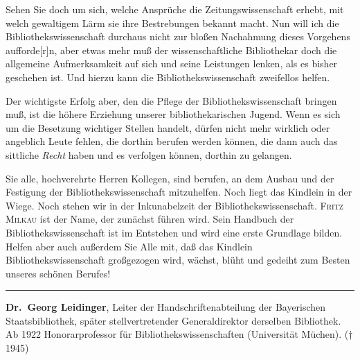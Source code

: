 \documentclass[a4paper,
fontsize=11pt,
oneside,
numbers=noperiodatend,
parskip=half-,
bibliography=totoc,
final
]{scrartcl}
\begin{document}
Sehen Sie doch um sich, welche Ansprüche die Zeitungswissenschaft
erhebt, mit welch gewaltigem Lärm sie ihre Bestrebungen bekannt macht.
Nun will ich die Bibliothekswissenschaft durchaus nicht zur bloßen
Nachahmung dieses Vorgehens aufforde{[}r{]}n, aber etwas mehr muß der
wissenschaftliche Bibliothekar doch die allgemeine Aufmerksamkeit auf
sich und seine Leistungen lenken, als es bisher geschehen ist. Und
hierzu kann die Bibliothekswissenschaft zweifellos helfen.

Der wichtigste Erfolg aber, den die Pflege der Bibliothekswissenschaft
bringen muß, ist die höhere Erziehung unserer bibliothekarischen Jugend.
Wenn es sich um die Besetzung wichtiger Stellen handelt, dürfen nicht
mehr wirklich oder angeblich Leute fehlen, die dorthin berufen werden
können, die dann auch das sittliche \emph{Recht} haben und es verfolgen
können, dorthin zu gelangen.

Sie alle, hochverehrte Herren Kollegen, sind berufen, an dem Ausbau und
der Festigung der Bibliothekswissenschaft mitzuhelfen. Noch liegt das
Kindlein in der Wiege. Noch stehen wir in der Inkunabelzeit der
Bibliothekswissenschaft. \textsc{Fritz Milkau} ist der Name, der
zunächst führen wird. Sein Handbuch der Bibliothekswissenschaft ist im
Entstehen und wird eine erste Grundlage bilden. Helfen aber auch
außerdem Sie Alle mit, daß das Kindlein Bibliothekswissenschaft
großgezogen wird, wächst, blüht und gedeiht zum Besten unseres schönen
Berufes!

\begin{center}\rule{0.5\linewidth}{\linethickness}\end{center}

\textbf{Dr.~Georg Leidinger}, Leiter der Handschriftenabteilung der
Bayerischen Staatsbibliothek, später stellvertretender Generaldirektor
derselben Bibliothek. Ab 1922 Honorarprofessor für
Bibliothekswissenschaften (Universität Müchen). († 1945)
\end{document}
